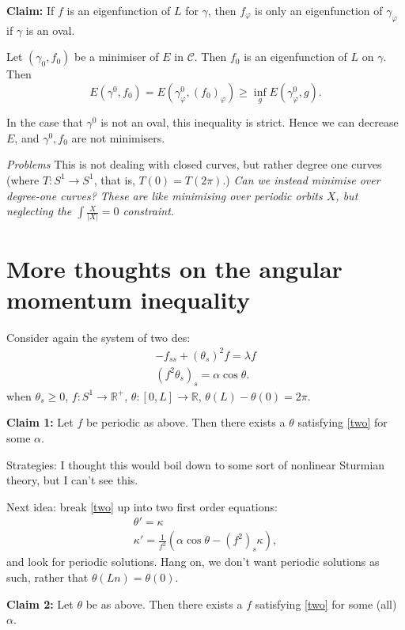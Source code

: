 \documentclass[12pt, a4paper]{amsart}
\theoremstyle{remark}
\begin{document}
\textbf{Claim:}    If $f$ is an eigenfunction of $L$ for $\gamma$, then $f_\varphi$ is only an eigenfunction of $\gamma_\varphi$ if $\gamma$ is an oval.  

Let $(\gamma_0,f_0)$ be a minimiser of $E$ in $\mathcal{C}$.   Then $f_0$ is an eigenfunction of $L$ on $\gamma$.   
Then 
$$ E(\gamma^0,f_0)=E(\gamma^0_\varphi,(f_0)_\varphi )\ge \inf_g E(\gamma^0_\varphi, g).$$

In the case that $\gamma^0$ is not an oval, this inequality is strict.   Hence we can decrease $E$, and $\gamma^0, f_0$ are not minimisers.  

\emph{Problems}   This is not dealing with closed curves, but rather degree one curves (where $T:S^1\rightarrow S^1$, that is, $T(0)=T(2\pi)$.)      \emph{Can we instead minimise over degree-one curves?   These are like minimising over periodic orbits $X$, but neglecting the $\int \frac{X}{|X|}=0$ constraint.   }

\newpage


\section*{More thoughts on the angular momentum inequality}


Consider again the system of two des:
\begin{gather}
-f_{ss}+(\theta_s)^2 f=\lambda f \label{one}\\
(f^2\theta_s)_s=\alpha\cos\theta. \label{two}
\end{gather}
when  $\theta_s\ge 0$, $f:S^1\rightarrow \mathbb{R}^+$, $\theta:[0,L]\rightarrow\mathbb{R}$, $\theta(L)-\theta(0)=2\pi$.   

\textbf{Claim 1:}  Let $f$ be periodic as above.    Then there exists a $\theta$ satisfying \eqref{two} for some $\alpha$.    

Strategies:   I thought this would boil down to some sort of nonlinear Sturmian theory, but I can't see this.   

Next idea:   break \eqref{two} up into two first order equations:
\begin{gather*}
\theta'=\kappa \\
\kappa'=\frac1{f^2}\left(\alpha \cos\theta-(f^2)_s\kappa\right),
\end{gather*}
and look for periodic solutions.  Hang on, we don't want periodic solutions as such, rather that $\theta(L n)=\theta(0)$.

\textbf{Claim 2:}  Let $\theta$ be as above.  Then there exists a $f$ satisfying \eqref{two} for some (all) $\alpha$.  
\end{document}

